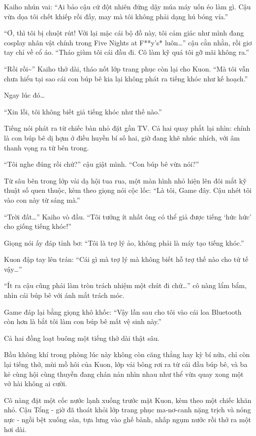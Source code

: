 \documentclass[../main.tex]{subfiles}
\begin{document}
Kaiho nhún vai: ``Ai bảo cậu cứ đột nhiên đứng dậy múa máy uốn éo làm gì. Cậu vừa dọa tôi chết khiếp rồi đấy, may mà tôi không phải dạng hú bóng vía.''

``Ơ, thì tôi bị chuột rút! Với lại mặc cái bộ đồ này, tôi cảm giác như mình đang cosplay nhân vật chính trong Five Nights at F**y's* luôn\dots'' cậu cằn nhằn, rồi giơ tay chỉ về cổ áo. ``Tháo giùm tôi cái đầu đi. Cô làm kỹ quá tôi gỡ mãi không ra.''

``Rồi rồi\~{}'' Kaiho thở dài, tháo nốt lớp trang phục còn lại cho Kuon. ``Mà tôi vẫn chưa hiểu tại sao cái con búp bê kia lại không phát ra tiếng khóc như kế hoạch.''

Ngay lúc đó\dots

``Xin lỗi, tôi không biết giả tiếng khóc như thế nào.''

Tiếng nói phát ra từ chiếc bàn nhỏ đặt gần TV. Cả hai quay phắt lại nhìn: chính là con búp bê dị hợm ở điều huyền bí số hai, giờ đang khẽ nhúc nhích, với âm thanh vọng ra từ bên trong.

``Tôi nghe đúng rồi chứ?'' cậu giật mình. ``Con búp bê vừa nói?''

Từ sâu bên trong lớp vải dạ hội tua rua, một màn hình nhỏ hiện lên đôi mắt kỹ thuật số quen thuộc, kèm theo giọng nói cộc lốc: ``Là tôi, Game đây. Cậu nhét tôi vào con này từ sáng mà.''

``Trời đất\dots'' Kaiho vò đầu. ``Tôi tưởng ít nhất ông có thể giả được tiếng `hức hức' cho giống tiếng khóc!''

Giọng nói ấy đáp tỉnh bơ: ``Tôi là trợ lý ảo, không phải là máy tạo tiếng khóc.''

Kuon đập tay lên trán: ``Cái gì mà trợ lý mà không biết hỗ trợ thế nào cho tử tế vậy\dots''

``Ít ra cậu cũng phải làm tròn trách nhiệm một chút đi chứ\dots'' cô nàng lẩm bẩm, nhìn cái búp bê với ánh mắt trách móc.

Game đáp lại bằng giọng khô khốc: ``Vậy lần sau cho tôi vào cái loa Bluetooth còn hơn là bắt tôi làm con búp bê mất vệ sinh này.''

Cả hai đồng loạt buông một tiếng thở dài thật sâu.

Bầu không khí trong phòng lúc này không còn căng thẳng hay kỳ bí nữa, chỉ còn lại tiếng thở, mùi mồ hôi của Kuon, lớp vải bông rơi ra từ cái đầu búp bê, và ba kẻ cùng hội cùng thuyền đang chán nản nhìn nhau như thể vừa quay xong một vở hài không ai cười.

\ct

Cô nàng đặt một cốc nước lạnh xuống trước mặt Kuon, kèm theo một chiếc khăn nhỏ. Cậu Tổng - giờ đã thoát khỏi lớp trang phục ma-nơ-canh nặng trịch và nóng nực - ngồi bệt xuống sàn, tựa lưng vào ghế bành, nhấp ngụm nước rồi thở ra một hơi dài.
\end{document}
